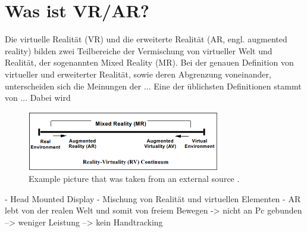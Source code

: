 	\section{Was ist VR/AR?}
		Die virtuelle Realität (VR) und die erweiterte Realität (AR, engl. augmented reality)  bilden  zwei Teilbereiche der Vermischung von virtueller Welt und Realität, der sogenannten Mixed Reality (MR). Bei der genauen Definition von virtueller und erweiterter Realität, sowie deren Abgrenzung voneinander, unterscheiden sich die Meinungen der ... 
		Eine der üblichsten Definitionen stammt von  ... Dabei wird 
		
		\begin{figure}[htbp]
			\centering
			\includegraphics[width=0.75\textwidth]{figures/mixed_reality.png}
			\caption{Example picture that was taken from an external source .}
			\label{fig:mixed_reality}
		\end{figure}
		
		- Head Mounted Display
		- Mischung von Realität und virtuellen Elementen
		- AR lebt von der realen Welt und somit von freiem Bewegen
		-> nicht an Pc gebunden
		--> weniger Leistung
		--> kein Handtracking